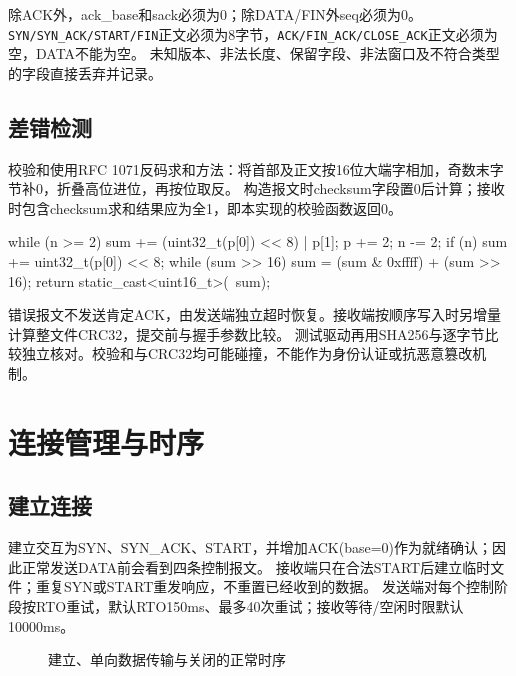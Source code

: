 \documentclass[UTF8,notitlepage,11pt]{ctexart}
\newcommand{\src}[1]{\nolinkurl{#1}}
\begin{document}
除ACK外，ack\_base和sack必须为0；除DATA/FIN外seq必须为0。
\src{SYN/SYN_ACK/START/FIN}正文必须为8字节，\src{ACK/FIN_ACK/CLOSE_ACK}正文必须为空，DATA不能为空。
未知版本、非法长度、保留字段、非法窗口及不符合类型的字段直接丢弃并记录。

\subsection{差错检测}
校验和使用RFC 1071反码求和方法\cite{rfc1071}：将首部及正文按16位大端字相加，奇数末字节补0，折叠高位进位，再按位取反。
构造报文时checksum字段置0后计算；接收时包含checksum求和结果应为全1，即本实现的校验函数返回0。
\begin{code}
while (n >= 2) {
    sum += (uint32_t(p[0]) << 8) | p[1];
    p += 2; n -= 2;
}
if (n) sum += uint32_t(p[0]) << 8;
while (sum >> 16) sum = (sum & 0xffff) + (sum >> 16);
return static_cast<uint16_t>(~sum);
\end{code}
错误报文不发送肯定ACK，由发送端独立超时恢复。接收端按顺序写入时另增量计算整文件CRC32，提交前与握手参数比较。
测试驱动再用SHA256与逐字节比较独立核对。校验和与CRC32均可能碰撞，不能作为身份认证或抗恶意篡改机制。

\section{连接管理与时序}\label{sec:state}
\subsection{建立连接}
建立交互为SYN、SYN\_ACK、START，并增加ACK(base=0)作为就绪确认；因此正常发送DATA前会看到四条控制报文。
接收端只在合法START后建立临时文件；重复SYN或START重发响应，不重置已经收到的数据。
发送端对每个控制阶段按RTO重试，默认RTO150ms、最多40次重试；接收等待/空闲时限默认10000ms。

\begin{figure}[H]\centering
{}\caption{建立、单向数据传输与关闭的正常时序}
\end{figure}
\end{document}
